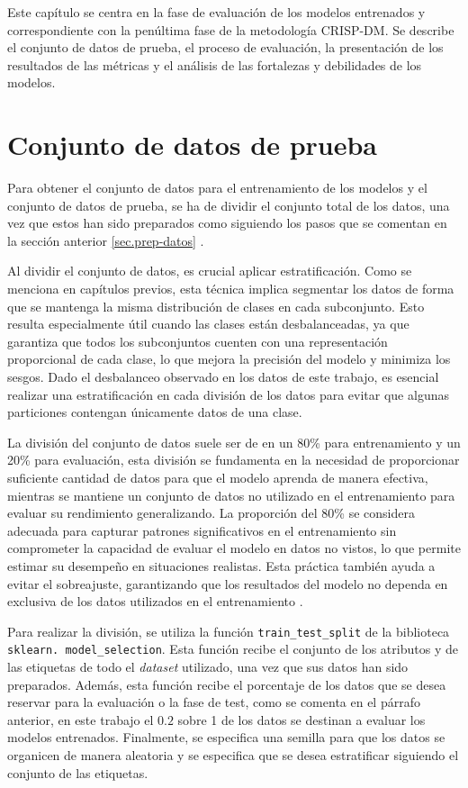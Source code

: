 Este capítulo se centra en la fase de evaluación de los modelos entrenados y correspondiente con la penúltima fase de la metodología CRISP-DM. Se describe el conjunto de datos de prueba, el proceso de evaluación, la presentación de los resultados de las métricas y el análisis de las fortalezas y debilidades de los modelos.

\section{Conjunto de datos de prueba}
Para obtener el conjunto de datos para el entrenamiento de los modelos y el conjunto de datos de prueba, se ha de dividir el conjunto total de los datos, una vez que estos han sido preparados como siguiendo los pasos que se comentan en la sección anterior \ref{sec.prep-datos} . 


Al dividir el conjunto de datos, es crucial aplicar estratificación. Como se menciona en capítulos previos, esta técnica implica segmentar los datos de forma que se mantenga la misma distribución de clases en cada subconjunto. Esto resulta especialmente útil cuando las clases están desbalanceadas, ya que garantiza que todos los subconjuntos cuenten con una representación proporcional de cada clase, lo que mejora la precisión del modelo y minimiza los sesgos. Dado el desbalanceo observado en los datos de este trabajo, es esencial realizar una estratificación en cada división de los datos para evitar que algunas particiones contengan únicamente datos de una clase.


La división del conjunto de datos suele ser de en un 80\% para entrenamiento y un 20\% para evaluación, esta división se fundamenta en la necesidad de proporcionar suficiente cantidad de datos para que el modelo aprenda de manera efectiva, mientras se mantiene un conjunto de datos no utilizado en el entrenamiento para evaluar su rendimiento generalizando. La proporción del 80\% se considera adecuada para capturar patrones significativos en el entrenamiento sin comprometer la capacidad de evaluar el modelo en datos no vistos, lo que permite estimar su desempeño en situaciones realistas. Esta práctica también ayuda a evitar el sobreajuste, garantizando que los resultados del modelo no dependa en exclusiva de los datos utilizados en el entrenamiento \cite{bishop2006pattern}.

Para realizar la división, se utiliza la función \texttt{train\_test\_split} de la biblioteca \texttt{sklearn. model\_selection}. Esta función recibe el conjunto de los atributos y de las etiquetas de todo el \textit{dataset} utilizado, una vez que sus datos han sido preparados. Además, esta función recibe el porcentaje de los datos que se desea reservar para la evaluación o la fase de test, como se comenta en el párrafo anterior, en este trabajo el $0.2$ sobre 1 de los datos se destinan a evaluar los modelos entrenados. Finalmente, se especifica una semilla para que los datos se organicen de manera aleatoria y se especifica que se desea estratificar siguiendo el conjunto de las etiquetas.

